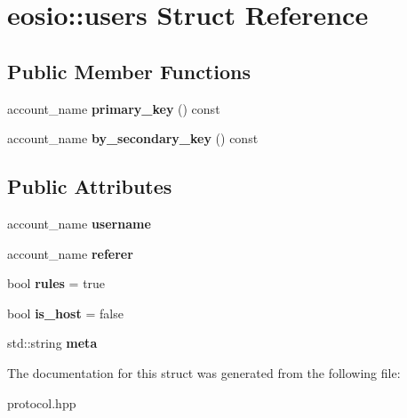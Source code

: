 \hypertarget{structeosio_1_1users}{}\section{eosio\+:\+:users Struct Reference}
\label{structeosio_1_1users}
\subsection*{Public Member Functions}
\begin{DoxyCompactItemize}
\item 
\mbox{\label{structeosio_1_1users_a18fdf05de817aedc40c941852375e69a}} 
account\+\_\+name {\bfseries primary\+\_\+key} () const
\item 
\mbox{\label{structeosio_1_1users_a66e02eeb1913b48fb3a9ca9dad9d9d77}} 
account\+\_\+name {\bfseries by\+\_\+secondary\+\_\+key} () const
\end{DoxyCompactItemize}
\subsection*{Public Attributes}
\begin{DoxyCompactItemize}
\item 
\mbox{\label{structeosio_1_1users_ad3989b05f2b791eb53e553b09bd32252}} 
account\+\_\+name {\bfseries username}
\item 
\mbox{\label{structeosio_1_1users_a5ae3b552db27a5e5a0c54d0638fa09f4}} 
account\+\_\+name {\bfseries referer}
\item 
\mbox{\label{structeosio_1_1users_aaeedc543153702aa5f21acec2309372c}} 
bool {\bfseries rules} = true
\item 
\mbox{\label{structeosio_1_1users_abd1a3bad3b68b2d470f21b4431c58d1e}} 
bool {\bfseries is\+\_\+host} = false
\item 
\mbox{\label{structeosio_1_1users_a75ad43ee45326207c97029d337d3b1fc}} 
std\+::string {\bfseries meta}
\end{DoxyCompactItemize}


The documentation for this struct was generated from the following file\+:\begin{DoxyCompactItemize}
\item 
protocol.\+hpp\end{DoxyCompactItemize}
